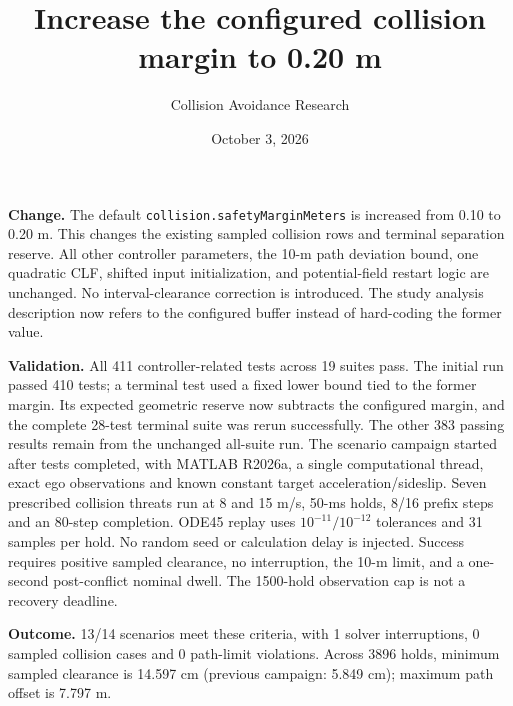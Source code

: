\documentclass[10pt]{article}
\title{Increase the configured collision margin to 0.20 m}
\author{Collision Avoidance Research}
\date{October 3, 2026}
\begin{document}
\maketitle
\textbf{Change.} The default \texttt{collision.safetyMarginMeters} is increased
from 0.10 to 0.20 m. This changes the existing sampled collision rows and
terminal separation reserve. All other controller parameters, the 10-m path
deviation bound, one quadratic CLF, shifted input initialization, and potential-field
restart logic are unchanged. No interval-clearance correction is introduced.
The study analysis description now refers to the configured buffer instead of
hard-coding the former value.

\textbf{Validation.} All 411 controller-related tests across 19 suites pass.
The initial run passed 410 tests; a terminal test used a fixed lower bound tied
to the former margin. Its expected geometric reserve now subtracts the configured
margin, and the complete 28-test terminal suite was rerun successfully.
The other 383 passing results remain from the unchanged all-suite run.
The scenario campaign started after tests completed, with MATLAB R2026a,
a single computational thread, exact ego observations and known constant target
acceleration/sideslip. Seven prescribed collision threats run at 8 and 15 m/s,
50-ms holds, 8/16 prefix steps and an 80-step completion. ODE45 replay uses
$10^{-11}/10^{-12}$ tolerances and 31 samples per hold. No random seed or
calculation delay is injected. Success requires positive sampled clearance,
no interruption, the 10-m limit, and a one-second post-conflict nominal dwell.
The 1500-hold observation cap is not a recovery deadline.

\textbf{Outcome.} 13/14 scenarios meet these criteria, with 1 solver interruptions, 0 sampled collision cases and 0 path-limit violations. Across 3896 holds, minimum sampled clearance is 14.597 cm (previous campaign: 5.849 cm); maximum path offset is 7.797 m.
\end{document}
